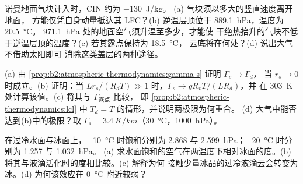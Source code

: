 \begin{exercise}[$\star\star\star$]\label{exo:b2:atmospheric-thermodynamics:10}
诺曼地面气块计入时，CIN 约为 \qty{-130}{J/kg}。
(a) 气块须以多大的竖直速度离开地面，
方能仅凭自身动量抵达其 LFC？(b) 逆温层顶位于 \qty{889.1}{hPa}，温度为 \qty{20.5}{\celsius}。
\qty{971.1}{hPa} 处的地面空气须升温至多少，才能使
干绝热抬升的气块不低于逆温层顶的温度？(c) 若其露点保持为 \qty{18.5}{\celsius}，
云底将在何处？(d) 说出大气不借助太阳即可
消除这类盖层的两种途径。
\end{exercise}

\begin{exercise}[$\star\star\star$]\label{exo:b2:atmospheric-thermodynamics:11}
(a) 由 \cref{prop:b2:atmospheric-thermodynamics:gamma-s} 证明 $\Gamma_s \to \Gamma_d$，
当 $r_s \to 0$ 时成立。(b) 证明：当 $Lr_s/(R_dT) \gg 1$ 时，$\Gamma_s \to gR_vT/(LR_d)$，并
在 \qty{303}{K} 处计算该值。(c) 将其与 $\Gamma_{\text{露点}}$ 比较，
即 \cref{prop:b2:atmospheric-thermodynamics:lcl} 中 $T_d = T$ 的情形，并说明两极限为何重合。
(d) 大气中能否达到(b)中的极限？取 $\Gamma_s =
\qty{3.4}{K/km}$（\qty{30}{\celsius}，\qty{1000}{hPa}）。
\end{exercise}

\begin{exercise}[$\star\star\star$]\label{exo:b2:atmospheric-thermodynamics:12}
在过冷水面与冰面上，\qty{-10}{\celsius} 时饱和分别为 2.868 与
\qty{2.599}{hPa}；\qty{-20}{\celsius} 时分别为 1.257 与 \qty{1.032}{hPa}。
(a) 求水面饱和的空气在两温度下相对冰面的度。(b)
将其与液滴活化时的度相比较。(c) 解释为何
接触少量冰晶的过冷液滴云会转变为冰。(d) 为何该效应在
\qty{0}{\celsius} 附近较弱？
\end{exercise}

